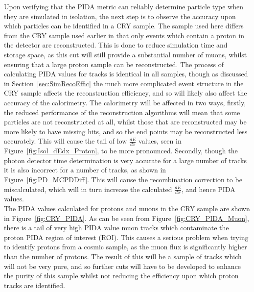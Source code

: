 Upon verifying that the PIDA metric can reliably determine particle type when they are simulated in isolation, the next step is to observe the accuracy upon which particles can be identified in a CRY sample. The sample used here differs from the CRY sample used earlier in that only events which contain a proton in the detector are reconstructed. This is done to reduce simulation time and storage space, as this cut will still provide a substantial number of muons, whilst ensuring that a large proton sample can be reconstructed. The process of calculating PIDA values for tracks is identical in all samples, though as discussed in Section~\ref{sec:SimRecoEffic} the much more complicated event structure in the CRY sample affects the reconstruction efficiency, and so will likely also affect the accuracy of the calorimetry. The calorimetry will be affected in two ways, firstly, the reduced performance of the reconstruction algorithms will mean that some particles are not reconstructed at all, whilst those that are reconstructed may be more likely to have missing hits, and so the end points may be reconstructed less accurately. This will cause the tail of low $\frac{dE}{dx}$ values, seen in Figure~\ref{fig:Isol_dEdx_Proton}, to be more pronounced. Secondly, though the photon detector time determination is very accurate for a large number of tracks it is also incorrect for a number of tracks, as shown in Figure~\ref{fig:PD_MCPDDiff}. This will cause the recombination correction to be miscalculated, which will in turn increase the calculated $\frac{dE}{dx}$, and hence PIDA values. \\

The PIDA values calculated for protons and muons in the CRY sample are shown in Figure~\ref{fig:CRY_PIDA}. As can be seen from Figure~\ref{fig:CRY_PIDA_Muon}, there is a tail of very high PIDA value muon tracks which contaminate the proton PIDA region of interest (ROI). This causes a serious problem when trying to identify protons from a cosmic sample, as the muon flux is significantly higher than the number of protons. The result of this will be a sample of tracks which will not be very pure, and so further cuts will have to be developed to enhance the purity of this sample whilst not reducing the efficiency upon which proton tracks are identified. \\

